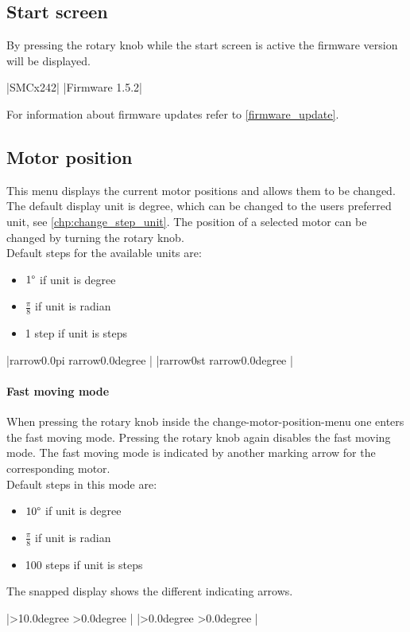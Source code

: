 \subsection{Start screen}
By pressing the rotary knob while the start screen is active the
firmware version will be displayed.
\begin{center}
  |SMCx242|
             |Firmware 1.5.2|
\end{center}

For information about firmware updates refer to \ref{firmware_update}.


\subsection{Motor position}
\label{menu_motor_pos}
This menu displays the current motor positions and allows them to be changed. The default display unit is degree, which can be changed to the users preferred unit, see \ref{chp:change_step_unit}. The position of a selected motor can be changed by turning the rotary knob.\\
Default steps for the available units are:
\begin{itemize}
\item $1\degree$ if unit is degree
\item $\frac{\pi}{8}$ if unit is radian
\item 1 step if unit is steps
\end{itemize}
\begin{center}
  |{rarrow}0.0{pi}   {rarrow}0.0{degree} |
             |{rarrow}0st    {rarrow}0.0{degree} |
\end{center}


\paragraph{Fast moving mode}
When pressing the rotary knob inside the change-motor-position-menu one enters the fast moving mode. Pressing the rotary knob again disables the fast moving mode. The fast moving mode is indicated by another marking arrow for the corresponding motor.\\
Default steps in this mode are:
\begin{itemize}
  \item $10\degree$ if unit is degree
  \item $\frac{\pi}{8}$ if unit is radian
  \item 100 steps if unit is steps
\end{itemize}
The snapped display shows the different indicating arrows.
\begin{center}
  |>10.0{degree} >0.0{degree} |
             |>0.0{degree}  >0.0{degree} |
\end{center}


